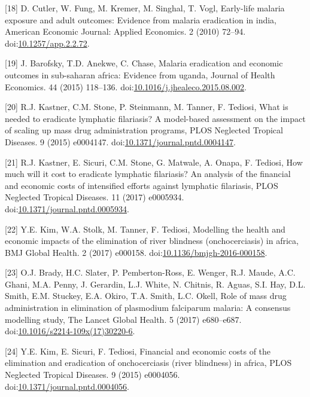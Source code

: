 \documentclass[]{article}
\begin{document}
\hypertarget{ref-Cutler_2010}{}
{[}18{]} D. Cutler, W. Fung, M. Kremer, M. Singhal, T. Vogl, Early-life
malaria exposure and adult outcomes: Evidence from malaria eradication
in india, American Economic Journal: Applied Economics. 2 (2010) 72--94.
doi:\href{https://doi.org/10.1257/app.2.2.72}{10.1257/app.2.2.72}.

\hypertarget{ref-Barofsky2015}{}
{[}19{]} J. Barofsky, T.D. Anekwe, C. Chase, Malaria eradication and
economic outcomes in sub-saharan africa: Evidence from uganda, Journal
of Health Economics. 44 (2015) 118--136.
doi:\href{https://doi.org/10.1016/j.jhealeco.2015.08.002}{10.1016/j.jhealeco.2015.08.002}.

\hypertarget{ref-Kastner2015}{}
{[}20{]} R.J. Kastner, C.M. Stone, P. Steinmann, M. Tanner, F. Tediosi,
What is needed to eradicate lymphatic filariasis? A model-based
assessment on the impact of scaling up mass drug administration
programs, PLOS Neglected Tropical Diseases. 9 (2015) e0004147.
doi:\href{https://doi.org/10.1371/journal.pntd.0004147}{10.1371/journal.pntd.0004147}.

\hypertarget{ref-Kastner2017}{}
{[}21{]} R.J. Kastner, E. Sicuri, C.M. Stone, G. Matwale, A. Onapa, F.
Tediosi, How much will it cost to eradicate lymphatic filariasis? An
analysis of the financial and economic costs of intensified efforts
against lymphatic filariasis, PLOS Neglected Tropical Diseases. 11
(2017) e0005934.
doi:\href{https://doi.org/10.1371/journal.pntd.0005934}{10.1371/journal.pntd.0005934}.

\hypertarget{ref-Kim2017}{}
{[}22{]} Y.E. Kim, W.A. Stolk, M. Tanner, F. Tediosi, Modelling the
health and economic impacts of the elimination of river blindness
(onchocerciasis) in africa, BMJ Global Health. 2 (2017) e000158.
doi:\href{https://doi.org/10.1136/bmjgh-2016-000158}{10.1136/bmjgh-2016-000158}.

\hypertarget{ref-Brady2017}{}
{[}23{]} O.J. Brady, H.C. Slater, P. Pemberton-Ross, E. Wenger, R.J.
Maude, A.C. Ghani, M.A. Penny, J. Gerardin, L.J. White, N. Chitnis, R.
Aguas, S.I. Hay, D.L. Smith, E.M. Stuckey, E.A. Okiro, T.A. Smith, L.C.
Okell, Role of mass drug administration in elimination of plasmodium
falciparum malaria: A consensus modelling study, The Lancet Global
Health. 5 (2017) e680--e687.
doi:\href{https://doi.org/10.1016/s2214-109x(17)30220-6}{10.1016/s2214-109x(17)30220-6}.

\hypertarget{ref-Kim2015}{}
{[}24{]} Y.E. Kim, E. Sicuri, F. Tediosi, Financial and economic costs
of the elimination and eradication of onchocerciasis (river blindness)
in africa, PLOS Neglected Tropical Diseases. 9 (2015) e0004056.
doi:\href{https://doi.org/10.1371/journal.pntd.0004056}{10.1371/journal.pntd.0004056}.
\end{document}

